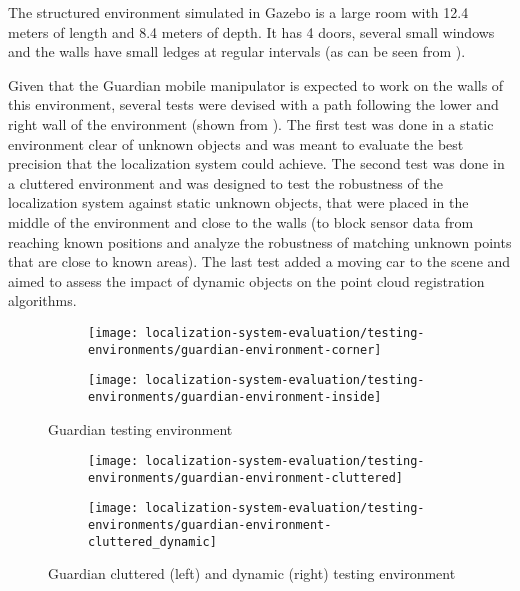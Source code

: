 The structured environment simulated in Gazebo is a large room with 12.4 meters of length and 8.4 meters of depth. It has 4 doors, several small windows and the walls have small ledges at regular intervals (as can be seen from ).

Given that the Guardian mobile manipulator is expected to work on the walls of this environment, several tests were devised with a path following the lower and right wall of the environment (shown from ). The first test was done in a static environment clear of unknown objects and was meant to evaluate the best precision that the localization system could achieve. The second test was done in a cluttered environment and was designed to test the robustness of the localization system against static unknown objects, that were placed in the middle of the environment and close to the walls (to block sensor data from reaching known positions and analyze the robustness of matching unknown points that are close to known areas). The last test added a moving car to the scene and aimed to assess the impact of dynamic objects on the point cloud registration algorithms.


\begin{figure}[H]
	\centering
	\begin{subfigure}[h]{.497\textwidth}
		\centering
		\texttt{[image: localization-system-evaluation/testing-environments/guardian-environment-corner]}
	\end{subfigure}
	\begin{subfigure}[h]{.497\textwidth}
		\centering
		\texttt{[image: localization-system-evaluation/testing-environments/guardian-environment-inside]}
	\end{subfigure}
	\caption{Guardian testing environment}
	\label{fig:localization-system-evaluation_guardian-tests-environment}
\end{figure}

\begin{figure}[H]
	\centering
	\begin{subfigure}[h]{.497\textwidth}
		\centering
		\texttt{[image: localization-system-evaluation/testing-environments/guardian-environment-cluttered]}
	\end{subfigure}
	\begin{subfigure}[h]{.497\textwidth}
		\centering
		\texttt{[image: localization-system-evaluation/testing-environments/guardian-environment-cluttered\_dynamic]}
	\end{subfigure}
	\caption{Guardian cluttered (left) and dynamic (right) testing environment}
	\label{fig:localization-system-evaluation_guardian-tests-environment-cluttered}
\end{figure}

